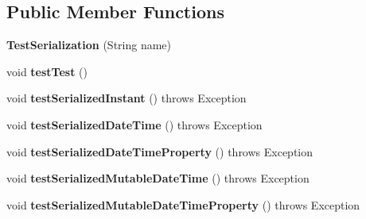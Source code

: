 \subsection*{Public Member Functions}
\begin{DoxyCompactItemize}
\item 
\hypertarget{classorg_1_1joda_1_1time_1_1_test_serialization_abd638219153ad644dceebf779bd170ca}{{\bfseries Test\-Serialization} (String name)}\label{classorg_1_1joda_1_1time_1_1_test_serialization_abd638219153ad644dceebf779bd170ca}

\item 
\hypertarget{classorg_1_1joda_1_1time_1_1_test_serialization_a90fb6d94b2921639e6a3a11ffdf66951}{void {\bfseries test\-Test} ()}\label{classorg_1_1joda_1_1time_1_1_test_serialization_a90fb6d94b2921639e6a3a11ffdf66951}

\item 
\hypertarget{classorg_1_1joda_1_1time_1_1_test_serialization_aafa7a7c3c87c25559788e47bb9043192}{void {\bfseries test\-Serialized\-Instant} ()  throws Exception }\label{classorg_1_1joda_1_1time_1_1_test_serialization_aafa7a7c3c87c25559788e47bb9043192}

\item 
\hypertarget{classorg_1_1joda_1_1time_1_1_test_serialization_af1a1ea2a706e8df50e1f501286aae120}{void {\bfseries test\-Serialized\-Date\-Time} ()  throws Exception }\label{classorg_1_1joda_1_1time_1_1_test_serialization_af1a1ea2a706e8df50e1f501286aae120}

\item 
\hypertarget{classorg_1_1joda_1_1time_1_1_test_serialization_a7619ef9c3b481198f43ade41273e1606}{void {\bfseries test\-Serialized\-Date\-Time\-Property} ()  throws Exception }\label{classorg_1_1joda_1_1time_1_1_test_serialization_a7619ef9c3b481198f43ade41273e1606}

\item 
\hypertarget{classorg_1_1joda_1_1time_1_1_test_serialization_a6b6e642b0e3f0826c92437aea8430209}{void {\bfseries test\-Serialized\-Mutable\-Date\-Time} ()  throws Exception }\label{classorg_1_1joda_1_1time_1_1_test_serialization_a6b6e642b0e3f0826c92437aea8430209}

\item 
\hypertarget{classorg_1_1joda_1_1time_1_1_test_serialization_a84057c0fbe27875b2c7c79ed33f4294b}{void {\bfseries test\-Serialized\-Mutable\-Date\-Time\-Property} ()  throws Exception }\label{classorg_1_1joda_1_1time_1_1_test_serialization_a84057c0fbe27875b2c7c79ed33f4294b}


\end{DoxyCompactItemize}
